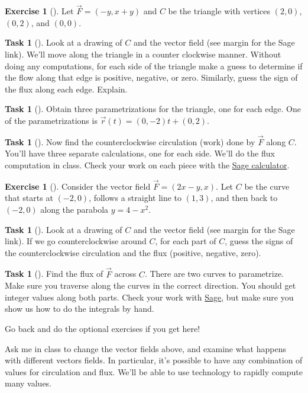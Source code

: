 \documentclass[10pt,]{book}
\theoremstyle{plain}
\theoremstyle{definition}
\theoremstyle{definition}
\theoremstyle{definition}
\theoremstyle{definition}
\newtheorem{exploration}[project]{Exercise}
\newtheorem{task}[project]{Task}
\theoremstyle{definition}
\numberwithin{equation}{section}
\newcommand{\sageworkfluxurl}{http://bmw.byuimath.com/dokuwiki/doku.php?id=both_flux_and_work}
\begin{document}
\begin{exploration}[]\label{exploration-202}
Let \(\vec F=(-y,x+y)\) and \(C\) be the triangle with vertices \((2,0)\), \((0,2)\), and \((0,0)\).%
\begin{task}[]\label{task-508}
Look at a drawing of \(C\) and the vector field (see margin for the Sage link).  We'll move along the triangle in a counter clockwise manner. Without doing any computations, for each side of the triangle make a guess to determine if the flow along that edge is positive, negative, or zero. Similarly, guess the sign of the flux along each edge.  Explain.%
\end{task}
\begin{task}[]\label{task-509}
Obtain three parametrizations for the triangle, one for each edge.  One of the parametrizations is \(\vec r(t) = (0,-2)t+(0,2)\).%
\end{task}
\begin{task}[]\label{task-510}
Now find the counterclockwise circulation (work) done by \(\vec F\) along \(C\).  You'll have three separate calculations, one for each side. We'll do the flux computation in class. Check your work on each piece with the \href{\\sageworkfluxurl}{Sage calculator}.%
\end{task}
\end{exploration}
\begin{exploration}[]\label{exploration-203}
Consider the vector field \(\vec F=(2x-y,x)\). Let \(C\) be the curve that starts at \((-2,0)\), follows a straight line to \((1,3)\), and then back to \((-2,0)\) along the parabola \(y=4-x^2\).%
\begin{task}[]\label{task-511}
Look at a drawing of \(C\) and the vector field (see margin for the Sage link).  If we go counterclockwise around \(C\), for each part of \(C\), guess the signs of the counterclockwise circulation and the flux (positive, negative, zero).%
\end{task}
\begin{task}[]\label{task-512}
Find the flux of \(\vec F\) across \(C\).  There are two curves to parametrize. Make sure you traverse along the curves in the correct direction. You should get integer values along both parts. Check your work with \href{\\sageworkfluxurl}{Sage}, but make sure you show us how to do the integrals by hand.%
%
\end{task}
\end{exploration}
Go back and do the optional exercises if you get here!%
\par
Ask me in class to change the vector fields above, and examine what happens with different vectors fields. In particular, it's possible to have any combination of values for circulation and flux. We'll be able to use technology to rapidly compute many values.%
\typeout{************************************************}
\typeout{************************************************}
\end{document}

